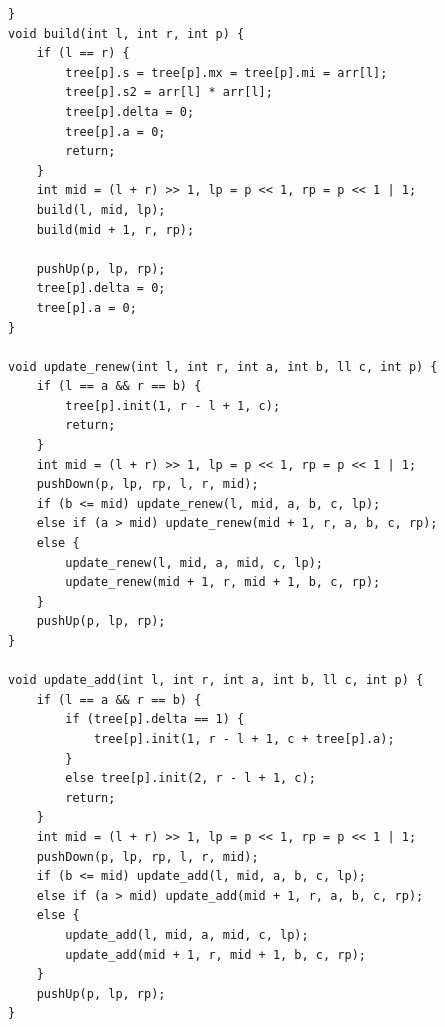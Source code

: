 \documentclass[twocolumn]{article}
\begin{document}
\begin{twocolumn}
\begin{lstlisting}[language={[ANSI]C}]
}
void build(int l, int r, int p) {
    if (l == r) {
        tree[p].s = tree[p].mx = tree[p].mi = arr[l];
        tree[p].s2 = arr[l] * arr[l];
        tree[p].delta = 0;
        tree[p].a = 0;
        return;
    }
    int mid = (l + r) >> 1, lp = p << 1, rp = p << 1 | 1;
    build(l, mid, lp);
    build(mid + 1, r, rp);

    pushUp(p, lp, rp);
    tree[p].delta = 0;
    tree[p].a = 0;
}

void update_renew(int l, int r, int a, int b, ll c, int p) {
    if (l == a && r == b) {
        tree[p].init(1, r - l + 1, c);
        return;
    }
    int mid = (l + r) >> 1, lp = p << 1, rp = p << 1 | 1;
    pushDown(p, lp, rp, l, r, mid);
    if (b <= mid) update_renew(l, mid, a, b, c, lp);
    else if (a > mid) update_renew(mid + 1, r, a, b, c, rp);
    else {
        update_renew(l, mid, a, mid, c, lp);
        update_renew(mid + 1, r, mid + 1, b, c, rp);
    }
    pushUp(p, lp, rp);
}

void update_add(int l, int r, int a, int b, ll c, int p) {
    if (l == a && r == b) {
        if (tree[p].delta == 1) {
            tree[p].init(1, r - l + 1, c + tree[p].a);
        }
        else tree[p].init(2, r - l + 1, c);
        return;
    }
    int mid = (l + r) >> 1, lp = p << 1, rp = p << 1 | 1;
    pushDown(p, lp, rp, l, r, mid);
    if (b <= mid) update_add(l, mid, a, b, c, lp);
    else if (a > mid) update_add(mid + 1, r, a, b, c, rp);
    else {
        update_add(l, mid, a, mid, c, lp);
        update_add(mid + 1, r, mid + 1, b, c, rp);
    }
    pushUp(p, lp, rp);
}


\end{lstlisting}
\end{twocolumn}
\end{document}
